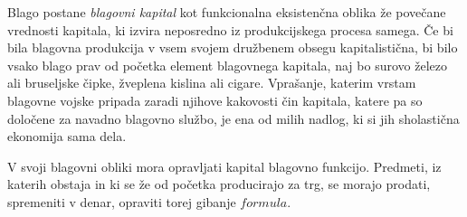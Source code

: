 \documentclass[kapital_02.tex]{subfiles}
\begin{document}
Blago postane \emph{blagovni kapital} kot funkcionalna eksistenčna oblika že povečane vrednosti kapitala, ki izvira neposredno iz produkcijskega procesa samega. Če bi bila blagovna produkcija v vsem svojem družbenem obsegu kapitalistična, bi bilo vsako blago prav od početka element blagovnega kapitala, naj bo surovo železo ali bruseljske čipke, žveplena kislina ali cigare. Vprašanje, katerim vrstam blagovne vojske pripada zaradi njihove kakovosti čin kapitala, katere pa so določene za navadno blagovno službo, je ena od milih nadlog, ki si jih sholastična ekonomija sama dela.

V svoji blagovni obliki mora opravljati kapital blagovno funkcijo. Predmeti, iz katerih obstaja in ki se že od početka producirajo za trg, se morajo prodati, spremeniti v denar, opraviti torej gibanje \( formula \).
\end{document}
